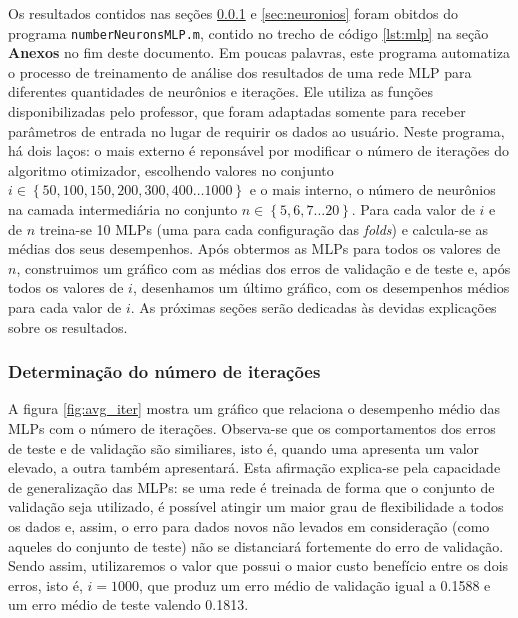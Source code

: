 Os resultados contidos nas seções \ref{sec:iteracoes} e \ref{sec:neuronios}
foram obitdos do programa \texttt{numberNeuronsMLP.m}, contido no trecho de
código \ref{lst:mlp} na seção \textbf{Anexos} no fim deste documento. Em poucas
palavras, este programa automatiza o processo de treinamento de análise dos
resultados de uma rede MLP para diferentes quantidades de neurônios e iterações.
Ele utiliza as funções disponibilizadas pelo professor, que foram adaptadas
somente para receber parâmetros de entrada no lugar de requirir os dados ao
usuário. Neste programa, há dois laços: o mais externo é reponsável por
modificar o número de iterações do algoritmo otimizador, escolhendo valores no
conjunto \(i \in \left\{ 50, 100, 150, 200, 300, 400 \dots 1000 \right\} \) e o
mais interno, o número de neurônios na camada intermediária no conjunto \( n \in
\left\{ 5, 6, 7 \dots 20 \right\} \). Para cada valor de \(i\) e de \(n\)
treina-se 10 MLPs (uma para cada configuração das \textit{folds}) e calcula-se
as médias dos seus desempenhos. Após obtermos as MLPs para todos os valores de \(n\), construimos
um gráfico com as médias dos erros de validação e de teste e, após todos os
valores de \(i\), desenhamos um último gráfico, com os desempenhos médios para
cada valor de \(i\). As próximas seções serão dedicadas às devidas explicações
sobre os resultados.

\subsubsection{Determinação do número de iterações}
\label{sec:iteracoes}

A figura \ref{fig:avg_iter} mostra um gráfico que relaciona o desempenho médio
das MLPs com o número de iterações. Observa-se que os comportamentos dos erros
de teste e de validação são similiares, isto é, quando uma apresenta um valor
elevado, a outra também apresentará. Esta afirmação explica-se pela capacidade
de generalização das MLPs: se uma rede é treinada de forma que o conjunto de
validação seja utilizado, é possível atingir um maior grau de flexibilidade a
todos os dados e, assim, o erro para dados novos não levados em consideração
(como aqueles do conjunto de teste) não se distanciará fortemente do erro de
validação. Sendo assim, utilizaremos o valor que possui o maior custo benefício
entre os dois erros, isto é, \(i = 1000\), que produz um erro médio de validação
igual a 0.1588 e um erro médio de teste valendo 0.1813.

